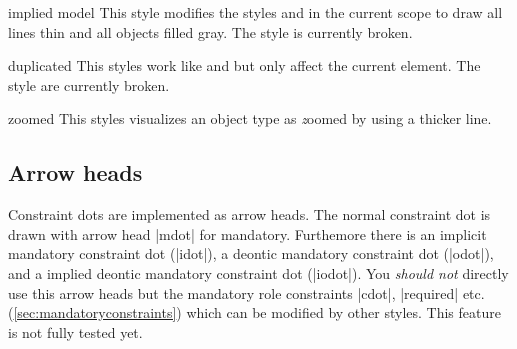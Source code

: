 \documentclass[a4paper,10pt]{article}
\begin{document}
\begin{stylekey}{implied model}
  This style modifies the styles  and  in the current scope to draw all lines thin and all objects filled gray.
  The style is currently broken.
\begin{figure}[h]
\centering
\begin{codeexample}[]
\end{codeexample}
\end{figure}
\end{stylekey}

\begin{stylekey}{duplicated}
This styles work like  and  but only affect the current element.
The style are currently broken.
\begin{codeexample}[]
\end{codeexample}
\end{stylekey}


\begin{stylekey}{zoomed}
This styles visualizes an object type as {\emph zoomed} by using a thicker line.
\begin{codeexample}[]
\end{codeexample}
\end{stylekey}


\subsection{Arrow heads}
\label{sec:arrowheads}
Constraint dots are implemented as arrow heads. The normal constraint 
dot is drawn with arrow head |mdot| for mandatory. Furthemore there is an
implicit mandatory constraint dot (|idot|), a deontic mandatory constraint 
dot (|odot|), and a implied deontic mandatory constraint dot (|iodot|). You 
\emph{should not} directly use this arrow heads but the mandatory role 
constraints |cdot|, |required| etc. (\ref{sec:mandatoryconstraints}) which
can be modified by other styles. This feature is not fully tested yet.
\end{document}
